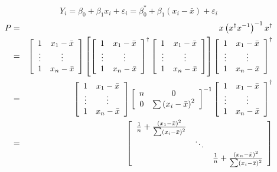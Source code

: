 \documentclass{article}
\begin{document}
\begin{equation*}
Y_{i}=\beta _{0}+\beta _{1}x_{i}+\varepsilon _{i}=\beta _{0}^{\ast }+\beta
_{1}\left( x_{i}-\bar{x}\right) +\varepsilon _{i}
\end{equation*}%
\begin{eqnarray*}
P &=&x\left( x^{\dagger }x^{-1}\right) ^{-1}x^{\dagger } \\
&=&\left[ 
\begin{array}{cc}
1 & x_{1}-\bar{x} \\ 
\vdots & \vdots \\ 
1 & x_{n}-\bar{x}%
\end{array}%
\right] \left[ \left[ 
\begin{array}{cc}
1 & x_{1}-\bar{x} \\ 
\vdots & \vdots \\ 
1 & x_{n}-\bar{x}%
\end{array}%
\right] ^{\dagger }\left[ 
\begin{array}{cc}
1 & x_{1}-\bar{x} \\ 
\vdots & \vdots \\ 
1 & x_{n}-\bar{x}%
\end{array}%
\right] \right] \left[ 
\begin{array}{cc}
1 & x_{1}-\bar{x} \\ 
\vdots & \vdots \\ 
1 & x_{n}-\bar{x}%
\end{array}%
\right] ^{\dagger } \\
&=&\left[ 
\begin{array}{cc}
1 & x_{1}-\bar{x} \\ 
\vdots & \vdots \\ 
1 & x_{n}-\bar{x}%
\end{array}%
\right] \left[ 
\begin{array}{cc}
n & 0 \\ 
0 & \tsum \left( x_{i}-\bar{x}\right) ^{2}%
\end{array}%
\right] ^{-1}\left[ 
\begin{array}{cc}
1 & x_{1}-\bar{x} \\ 
\vdots & \vdots \\ 
1 & x_{n}-\bar{x}%
\end{array}%
\right] ^{\dagger } \\
&=&\left[ 
\begin{array}{ccc}
\frac{1}{n}+\frac{\left( x_{1}-\bar{x}\right) ^{2}}{\tsum \left( x_{i}-\bar{x%
}\right) ^{2}} &  &  \\ 
& \ddots &  \\ 
&  & \frac{1}{n}+\frac{\left( x_{n}-\bar{x}\right) ^{2}}{\tsum \left( x_{i}-%
\bar{x}\right) ^{2}}%
\end{array}%
\right]
\end{eqnarray*}
\end{document}
